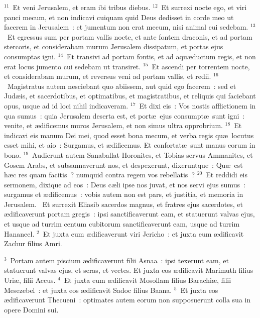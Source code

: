 ${}^{11}$~Et veni Jerusalem, et eram ibi tribus diebus.
${}^{12}$~Et surrexi nocte ego, et viri pauci mecum, et non indicavi cuiquam quid Deus dedisset in corde meo ut facerem in Jerusalem~: et jumentum non erat mecum, nisi animal cui sedebam.
${}^{13}$~Et egressus sum per portam vallis nocte, et ante fontem draconis, et ad portam stercoris, et considerabam murum Jerusalem dissipatum, et portas ejus consumptas igni.
${}^{14}$~Et transivi ad portam fontis, et ad aqu\ae ductum regis, et non erat locus jumento cui sedebam ut transiret.
${}^{15}$~Et ascendi per torrentem nocte, et considerabam murum, et reversus veni ad portam vallis, et redii.
${}^{16}$~Magistratus autem nesciebant quo abiissem, aut quid ego facerem~: sed et Jud\ae is, et sacerdotibus, et optimatibus, et magistratibus, et reliquis qui faciebant opus, usque ad id loci nihil indicaveram.
${}^{17}$~Et dixi eis~: Vos nostis afflictionem in qua sumus~: quia Jerusalem deserta est, et port\ae\ ejus consumpt\ae\ sunt igni~: venite, et \ae dificemus muros Jerusalem, et non simus ultra opprobrium.
${}^{18}$~Et indicavi eis manum Dei mei, quod esset bona mecum, et verba regis qu\ae\ locutus esset mihi, et aio~: Surgamus, et \ae dificemus. Et confortat\ae\ sunt manus eorum in bono.
${}^{19}$~Audierunt autem Sanaballat Horonites, et Tobias servus Ammanites, et Gosem Arabs, et subsannaverunt nos, et despexerunt, dixeruntque~: Qu\ae\ est h\ae c res quam facitis~? numquid contra regem vos rebellatis~?
${}^{20}$~Et reddidi eis sermonem, dixique ad eos~: Deus c\ae li ipse nos juvat, et nos servi ejus sumus~: surgamus et \ae dificemus~: vobis autem non est pars, et justitia, et memoria in Jerusalem.
~Et surrexit Eliasib sacerdos magnus, et fratres ejus sacerdotes, et \ae dificaverunt portam gregis~: ipsi sanctificaverunt eam, et statuerunt valvas ejus, et usque ad turrim centum cubitorum sanctificaverunt eam, usque ad turrim Hananeel.
${}^{2}$~Et juxta eum \ae dificaverunt viri Jericho~: et juxta eum \ae dificavit Zachur filius Amri.


${}^{3}$~Portam autem piscium \ae dificaverunt filii Asnaa~: ipsi texerunt eam, et statuerunt valvas ejus, et seras, et vectes. Et juxta eos \ae dificavit Marimuth filius Uri\ae , filii Accus.
${}^{4}$~Et juxta eum \ae dificavit Mosollam filius Barachi\ae , filii Mesezebel~: et juxta eos \ae dificavit Sadoc filius Baana.
${}^{5}$~Et juxta eos \ae dificaverunt Thecueni~: optimates autem eorum non supposuerunt colla sua in opere Domini sui.


